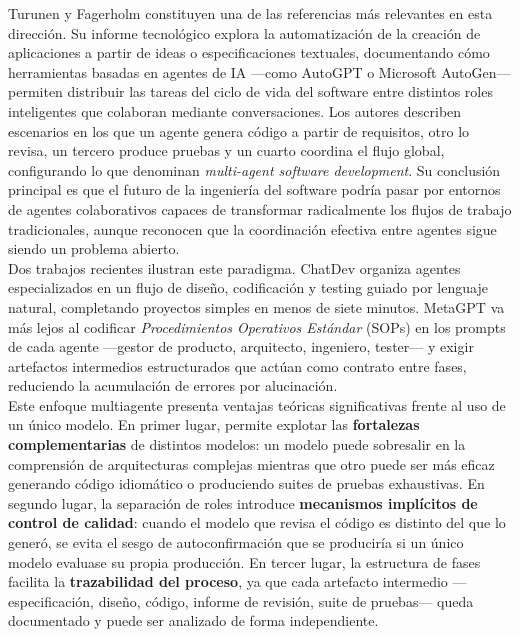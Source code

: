Turunen y Fagerholm \cite{Turunen:2023:FromIdeas} constituyen una de las referencias más relevantes en esta dirección. Su informe tecnológico explora la automatización de la creación de aplicaciones a partir de ideas o especificaciones textuales, documentando cómo herramientas basadas en agentes de \ac{IA} ---como AutoGPT o Microsoft AutoGen--- permiten distribuir las tareas del ciclo de vida del software entre distintos roles inteligentes que colaboran mediante conversaciones. Los autores describen escenarios en los que un agente genera código a partir de requisitos, otro lo revisa, un tercero produce pruebas y un cuarto coordina el flujo global, configurando lo que denominan \textit{multi-agent software development}. Su conclusión principal es que el futuro de la ingeniería del software podría pasar por entornos de agentes colaborativos capaces de transformar radicalmente los flujos de trabajo tradicionales, aunque reconocen que la coordinación efectiva entre agentes sigue siendo un problema abierto.\\

Dos trabajos recientes ilustran este paradigma. ChatDev \cite{Qian:2024:ChatDev} organiza agentes especializados en un flujo de diseño, codificación y testing guiado por lenguaje natural, completando proyectos simples en menos de siete minutos. MetaGPT \cite{Hong:2024:MetaGPT} va más lejos al codificar \textit{Procedimientos Operativos Estándar} (SOPs) en los prompts de cada agente ---gestor de producto, arquitecto, ingeniero, tester--- y exigir artefactos intermedios estructurados que actúan como contrato entre fases, reduciendo la acumulación de errores por alucinación.\\

Este enfoque multiagente presenta ventajas teóricas significativas frente al uso de un único modelo. En primer lugar, permite explotar las \textbf{fortalezas complementarias} de distintos modelos: un modelo puede sobresalir en la comprensión de arquitecturas complejas mientras que otro puede ser más eficaz generando código idiomático o produciendo suites de pruebas exhaustivas. En segundo lugar, la separación de roles introduce \textbf{mecanismos implícitos de control de calidad}: cuando el modelo que revisa el código es distinto del que lo generó, se evita el sesgo de autoconfirmación que se produciría si un único modelo evaluase su propia producción. En tercer lugar, la estructura de fases facilita la \textbf{trazabilidad del proceso}, ya que cada artefacto intermedio ---especificación, diseño, código, informe de revisión, suite de pruebas--- queda documentado y puede ser analizado de forma independiente.\\

